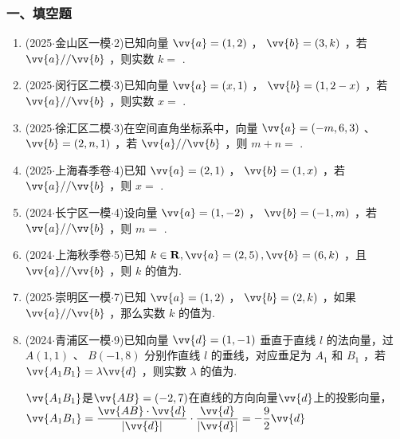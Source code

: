 \subsubsection*{一、填空题}
\begin{enumerate}
    \item (2025$\cdot$金山区一模$\cdot$2)已知向量 $\vv{a} = \left( {1,2}\right)$ ， $\vv{b} = \left( {3,k}\right)$ ，若 $\vv{a}//\vv{b}$ ，则实数 $k =$ .

    \item (2025$\cdot$闵行区二模$\cdot$3)已知向量 $\vv{a} = \left( {x,1}\right)$ ， $\vv{b} = \left( {1,2 - x}\right)$ ，若 $\vv{a}//\vv{b}$ ，则实数 $x =$ .

    \item (2025$\cdot$徐汇区二模$\cdot$3)在空间直角坐标系中，向量 $\vv{a} = \left( {-m,6,3}\right)$ 、 $\vv{b} = \left( {2,n,1}\right)$ ，若 $\vv{a}//\vv{b}$ ，则 $m + n =$ .

    \item (2025$\cdot$上海春季卷$\cdot$4)已知 $\vv{a} = \left( {2,1}\right)$ ， $\vv{b} = \left( {1,x}\right)$ ，若 $\vv{a}//\vv{b}$ ，则 $x =$ .

    \item (2024$\cdot$长宁区一模$\cdot$4)设向量 $\vv{a} = \left( {1, - 2}\right)$ ， $\vv{b} = \left( {-1,m}\right)$ ，若 $\vv{a}//\vv{b}$ ，则 $m =$ .

    \item (2024$\cdot$上海秋季卷$\cdot$5)已知 $k \in  \mathbf{R},\vv{a} = \left( {2,5}\right) ,\vv{b} = \left( {6,k}\right)$ ，且 $\vv{a}//\vv{b}$ ，则 $k$ 的值为.

    \item (2025$\cdot$崇明区一模$\cdot$7)已知 $\vv{a} = \left( {1,2}\right)$ ， $\vv{b} = \left( {2,k}\right)$ ，如果 $\vv{a}//\vv{b}$ ，那么实数 $k$ 的值为.

    \item (2024$\cdot$青浦区一模$\cdot$9)已知向量 $\vv{d} = \left( {1, - 1}\right)$ 垂直于直线 $l$ 的法向量，过 $A\left( {1,1}\right)$ 、 $B\left( {-1,8}\right)$ 分别作直线 $l$ 的垂线，对应垂足为 ${A}_{1}$ 和 ${B}_{1}$ ，若 $\vv{{A_1}{B_1}} = \lambda \vv{d}$ ，则实数 $\lambda$ 的值为.
    \begin{jieda}
        $\vv{{A_1}{B_1}}$是$\vv{AB} = (-2, 7)$在直线的方向向量$\vv{d}$上的投影向量，$\vv{{A_1}{B_1}} = \dfrac{\vv{AB} \cdot \vv{d}}{\left|\vv{d}\right|} \cdot \dfrac{\vv{d}}{\left|\vv{d}\right|} = -\dfrac{9}{2}\vv{d}$
    \end{jieda}


\end{enumerate}
